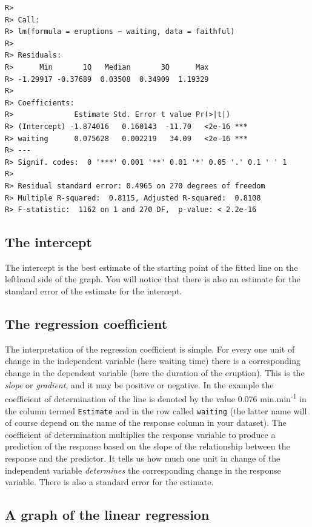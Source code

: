 \documentclass[english,10pt,a4paper,oneside]{book}
\theoremstyle{definition}
\theoremstyle{definition}
\theoremstyle{definition}
\theoremstyle{remark}
\begin{document}
\begin{verbatim}
R> 
R> Call:
R> lm(formula = eruptions ~ waiting, data = faithful)
R> 
R> Residuals:
R>      Min       1Q   Median       3Q      Max 
R> -1.29917 -0.37689  0.03508  0.34909  1.19329 
R> 
R> Coefficients:
R>              Estimate Std. Error t value Pr(>|t|)    
R> (Intercept) -1.874016   0.160143  -11.70   <2e-16 ***
R> waiting      0.075628   0.002219   34.09   <2e-16 ***
R> ---
R> Signif. codes:  0 '***' 0.001 '**' 0.01 '*' 0.05 '.' 0.1 ' ' 1
R> 
R> Residual standard error: 0.4965 on 270 degrees of freedom
R> Multiple R-squared:  0.8115, Adjusted R-squared:  0.8108 
R> F-statistic:  1162 on 1 and 270 DF,  p-value: < 2.2e-16
\end{verbatim}

\subsection{The intercept}\label{the-intercept}

The intercept is the best estimate of the starting point of the fitted
line on the lefthand side of the graph. You will notice that there is
also an estimate for the standard error of the estimate for the
intercept.

\subsection{The regression
coefficient}\label{the-regression-coefficient}

The interpretation of the regression coefficient is simple. For every
one unit of change in the independent variable (here waiting time) there
is a corresponding change in the dependent variable (here the duration
of the eruption). This is the \emph{slope} or \emph{gradient}, and it
may be positive or negative. In the example the coefficient of
determination of the line is denoted by the value 0.076
min.min\textsuperscript{-1} in the column termed \texttt{Estimate} and
in the row called \texttt{waiting} (the latter name will of course
depend on the name of the response column in your dataset). The
coefficient of determination multiplies the response variable to produce
a prediction of the response based on the slope of the relationship
between the response and the predictor. It tells us how much one unit in
change of the independent variable \emph{determines} the corresponding
change in the response variable. There is also a standard error for the
estimate.

\subsection{A graph of the linear
regression}\label{a-graph-of-the-linear-regression}
\end{document}
